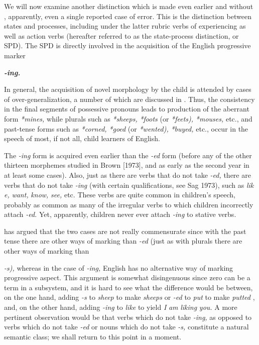 We will now examine another distinction which is made even earlier and without , apparently, even a single reported case of error. This is the distinction between states and processes, including under the latter rubric verbs of experiencing as well as action verbs (hereafter referred to as the state-process distinction, or SPD). The SPD is di\-rectly involved in the acquisition of the English progressive marker

\textbf{\textit{{}-ing.}}



In general, the acquisition of novel morphology by the child is attended by cases of over-generalization, a number of which are dis\-cussed in \citet{Cazden1968}. Thus, the consistency in the final segments of possessive pronouns leads to production of the aberrant form \textit{*mines,} while plurals such as \textit{*sheeps,} \textit{*foots} (or \textit{*feets}\textit{),} \textit{*mouses,} etc., and past-tense forms such as \textit{*corned,} \textit{*goed} (or \textit{*wented}\textit{),} \textit{*buyed, }etc., occur in the speech of most, if not all, child learners of English.

The \textit{{}-i}\textit{n}\textit{g }form is acquired even earlier than the \textit{{}-ed} form (before
any of the other thirteen morphemes studied in Brown [1973], and as early as the second year in at least some cases). Also, just as there are verbs that do not take \textit{{}-ed,} there are verbs that do not take \textit{{}-ing} (with certain qualifications, see Sag 1973), such as \textit{lik} \textit{e,} \textit{want,} \textit{know,} \textit{see,} etc. These verbs are quite common in children's speech, probably as common as many of the irregular verbs to which children incor\-rectly attach \textit{{}-ed.} Yet, apparently, children never ever attach \textit{{}-ing} to stative verbs.

\citet{Kuczaj1978} has argued that the two cases are not really commensurate since with the past tense there are other ways of mark\-ing than \textit{{}-ed }(just as with plurals there are other ways of marking than

\textit{{}-}\textit{s}\textit{),} whereas in the case of \textit{{}-ing,} English has no alternative way of marking progressive aspect. This argument is somewhat disingenuous since zero can be a term in a subsystem, and it is hard to see what the difference would be between, on the one hand, adding \textit{{}-s} to \textit{sheep }to make \textit{sheeps} or \textit{{}-ed} to \textit{put} to make \textit{putted} , and, on the other hand, adding \textit{{}-ing} to \textit{like} to yield \textit{I} \textit{am} \textit{liking} \textit{you. }A more pertinent observa\-tion would be that verbs which do not take \textit{{}-ing,} as opposed to verbs which do not take \textit{{}-ed} or nouns which do not take \textit{{}-s,} constitute a natural semantic class; we shall return to this point in a moment.

